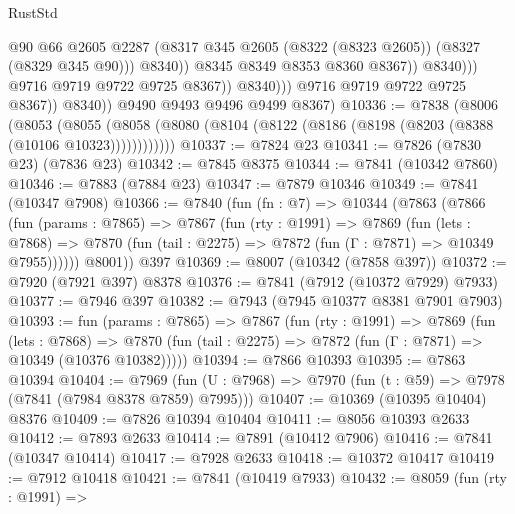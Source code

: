 \begin{lexlean}{RustStd}
\begin{coremodule}
                                      @90
                                      @66
                                      @2605
                                      @2287
                                      (@8317
                                        @345
                                        @2605
                                        (@8322 (@8323 @2605))
                                        (@8327 (@8329 @345 @90)))
                                      @8340))
                                  @8345
                                  @8349
                                  @8353
                                  @8360
                                  @8367))
                              @8340)))
                        @9716
                        @9719
                        @9722
                        @9725
                        @8367))
                    @8340)))
              @9716
              @9719
              @9722
              @9725
              @8367))
          @8340))
      @9490
      @9493
      @9496
      @9499
      @8367)
@10336 := @7838
    (@8006
      (@8053
        (@8055 (@8058 (@8080 (@8104 (@8122 (@8186 (@8198 (@8203 (@8388 (@10106 @10323))))))))))))
@10337 := @7824 @23
@10341 := @7826 (@7830 @23) (@7836 @23)
@10342 := @7845 @8375
@10344 := @7841 (@10342 @7860)
@10346 := @7883 (@7884 @23)
@10347 := @7879 @10346
@10349 := @7841 (@10347 @7908)
@10366 := @7840
    (fun (fn : @7) =>
    @10344
      (@7863
        (@7866
          (fun (params : @7865) =>
          @7867
            (fun (rty : @1991) =>
            @7869
              (fun (lets : @7868) =>
              @7870 (fun (tail : @2275) => @7872 (fun (Γ : @7871) => @10349 @7955))))))
        @8001))
    @397
@10369 := @8007 (@10342 (@7858 @397))
@10372 := @7920 (@7921 @397) @8378
@10376 := @7841 (@7912 (@10372 @7929) @7933)
@10377 := @7946 @397
@10382 := @7943 (@7945 @10377 @8381 @7901 @7903)
@10393 := fun (params : @7865) =>
  @7867
    (fun (rty : @1991) =>
    @7869
      (fun (lets : @7868) =>
      @7870 (fun (tail : @2275) => @7872 (fun (Γ : @7871) => @10349 (@10376 @10382)))))
@10394 := @7866 @10393
@10395 := @7863 @10394
@10404 := @7969
    (fun (U : @7968) => @7970 (fun (t : @59) => @7978 (@7841 (@7984 @8378 @7859) @7995)))
@10407 := @10369 (@10395 @10404) @8376
@10409 := @7826 @10394 @10404
@10411 := @8056 @10393 @2633
@10412 := @7893 @2633
@10414 := @7891 (@10412 @7906)
@10416 := @7841 (@10347 @10414)
@10417 := @7928 @2633
@10418 := @10372 @10417
@10419 := @7912 @10418
@10421 := @7841 (@10419 @7933)
@10432 := @8059
    (fun (rty : @1991) =>

\end{coremodule}
\end{lexlean}
